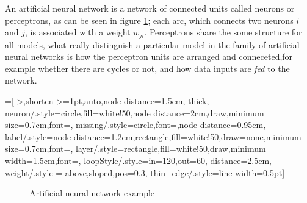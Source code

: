  
An artificial neural network is a network of connected units called neurons or perceptrons, as can be seen in figure \ref{fully_connected}; each arc, which connects two neurons $i$ and $j$, is associated with a weight $w_{ji}$. Perceptrons share the some
structure for all models, what really distinguish a particular model in the family of artificial neural networks is how the perceptron units are arranged and conneceted,for example whether there are cycles
or not, and how data inputs are \textit{fed} to the network. 


=[->,shorten >=1pt,auto,node distance=1.5cm,
  thick,
  neuron/.style={circle,fill=white!50,node distance=2cm,draw,minimum size=0.7cm,font=\sffamily\normalsize},
  missing/.style={circle,font=\sffamily\Large,node distance=0.95cm},
  label/.style={node distance=1.2cm,rectangle,fill=white!50,draw=none,minimum size=0.7cm,font=\sffamily\normalsize},
  layer/.style={rectangle,fill=white!50,draw,minimum width=1.5cm,font=\sffamily\Large},
  loopStyle/.style={in=120,out=60, distance=2.5cm},
  weight/.style = {above,sloped,pos=0.3},
  thin_edge/.style={line width=0.5pt}]
\begin{figure}
 \centering
{}
\caption{Artificial neural network example}
\label{fully_connected}
\end{figure}


